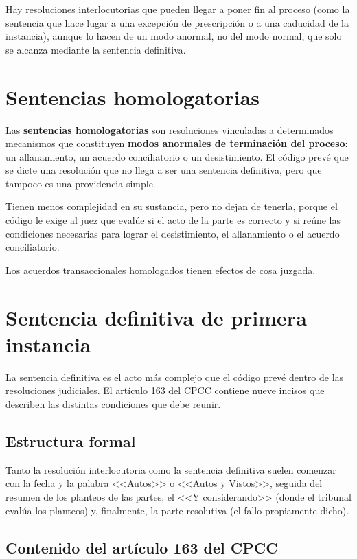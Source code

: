 \documentclass[12pt,oneside]{book}
\begin{document}
Hay resoluciones interlocutorias que pueden llegar a poner fin al proceso (como la sentencia que hace lugar a una excepción de prescripción o a una caducidad de la instancia), aunque lo hacen de un modo anormal, no del modo normal, que solo se alcanza mediante la sentencia definitiva.

\section{Sentencias homologatorias}

Las \textbf{sentencias homologatorias} son resoluciones vinculadas a determinados mecanismos que constituyen \textbf{modos anormales de terminación del proceso}: un allanamiento, un acuerdo conciliatorio o un desistimiento. El código prevé que se dicte una resolución que no llega a ser una sentencia definitiva, pero que tampoco es una providencia simple.

Tienen menos complejidad en su sustancia, pero no dejan de tenerla, porque el código le exige al juez que evalúe si el acto de la parte es correcto y si reúne las condiciones necesarias para lograr el desistimiento, el allanamiento o el acuerdo conciliatorio.

\begin{important}
Los acuerdos transaccionales homologados tienen efectos de cosa juzgada.
\end{important}

\section{Sentencia definitiva de primera instancia}

La sentencia definitiva es el acto más complejo que el código prevé dentro de las resoluciones judiciales. El artículo 163 del CPCC contiene nueve incisos que describen las distintas condiciones que debe reunir.

\subsection{Estructura formal}

Tanto la resolución interlocutoria como la sentencia definitiva suelen comenzar con la fecha y la palabra <<Autos>> o <<Autos y Vistos>>, seguida del resumen de los planteos de las partes, el <<Y considerando>> (donde el tribunal evalúa los planteos) y, finalmente, la parte resolutiva (el fallo propiamente dicho).

\subsection{Contenido del artículo 163 del CPCC}
\end{document}
